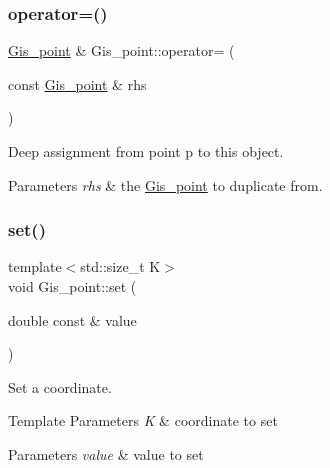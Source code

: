 \subsubsection{\texorpdfstring{operator=()}{operator=()}}
{\footnotesize\ttfamily \mbox{\hyperlink{classGis__point}{Gis\+\_\+point}} \& Gis\+\_\+point\+::operator= (\begin{DoxyParamCaption}\item[{const \mbox{\hyperlink{classGis__point}{Gis\+\_\+point}} \&}]{rhs }\end{DoxyParamCaption})}

Deep assignment from point \textquotesingle{}p\textquotesingle{} to this object. 
\begin{DoxyParams}{Parameters}
{\em rhs} & the \mbox{\hyperlink{classGis__point}{Gis\+\_\+point}} to duplicate from. \\
\hline
\end{DoxyParams}
\mbox{\label{classGis__point_af22de0c9afb8fe99da0cfb70ecdfe64a}} 
\subsubsection{\texorpdfstring{set()}{set()}}
{\footnotesize\ttfamily template$<$std\+::size\+\_\+t K$>$ \\
void Gis\+\_\+point\+::set (\begin{DoxyParamCaption}\item[{double const \&}]{value }\end{DoxyParamCaption})\hspace{0.3cm}{\ttfamily [inline]}}



Set a coordinate. 


\begin{DoxyTemplParams}{Template Parameters}
{\em K} & coordinate to set \\
\hline
\end{DoxyTemplParams}

\begin{DoxyParams}{Parameters}
{\em value} & value to set \\
\hline
\end{DoxyParams}
\mbox{\label{classGis__point_ace10c7ba2a76d04093877818d0a08728}} 
